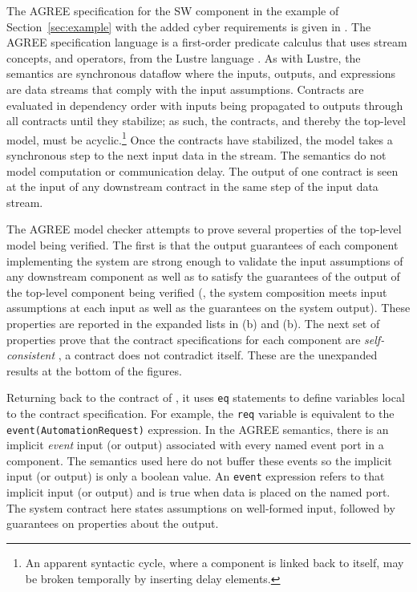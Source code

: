 The AGREE specification for the SW component in the example of Section~\ref{sec:example} with the added cyber requirements is given in .
The AGREE specification language is a first-order predicate calculus that uses stream concepts, and operators, from the Lustre language \cite{10.1145/41625.41641}.
As with Lustre, the semantics are synchronous dataflow where the inputs, outputs, and expressions are data streams that comply with the input assumptions.
Contracts are evaluated in dependency order with inputs being propagated to outputs through all contracts until they stabilize; as such, the contracts, and thereby the top-level model, must be acyclic.\footnote{An apparent syntactic cycle, where a component is linked back to itself, may be broken temporally by inserting delay elements.}
Once the contracts have stabilized, the model takes a synchronous step to the next input data in the stream.
The semantics do not model computation or communication delay.
The output of one contract is seen at the input of any downstream contract in the same step of the input data stream.

The AGREE model checker attempts to prove several properties of the top-level model being verified.
The first is that the output guarantees of each component implementing the system are strong enough to validate the input assumptions of any downstream component as well as to satisfy the guarantees of the output of the top-level component being verified (\ie, the system composition meets input assumptions at each input as well as the guarantees on the system output).
These properties are reported in the expanded lists in (b) and (b).
The next set of properties prove that the contract specifications for each component are \emph{self-consistent} \ie, a contract does not contradict itself.
These are the unexpanded results at the bottom of the figures.

Returning back to the contract of , it uses \texttt{eq} statements to define variables local to the contract specification.
For example, the \texttt{req} variable is equivalent to the \texttt{event(AutomationRequest)} expression.
In the AGREE semantics, there is an implicit \emph{event} input (or output) associated with every named event port in a component.
The semantics used here do not buffer these events so the implicit input (or output) is only a boolean value.
An \texttt{event} expression refers to that implicit input (or output) and is true when data is placed on the named port.
The system contract here states assumptions on well-formed input, followed by guarantees on properties about the output.


